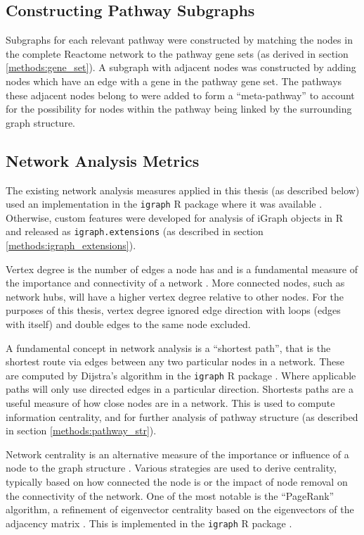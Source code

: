 \subsection{Constructing Pathway Subgraphs} \label{methods:subgraphs}
Subgraphs for each relevant pathway were constructed by matching the nodes in the complete Reactome network to the pathway gene sets (as derived in section \ref{methods:gene_set}). A subgraph with adjacent nodes was constructed by adding nodes which have an edge with a gene in the pathway gene set. The pathways these adjacent nodes belong to were added to form a ``meta-pathway'' to account for the possibility for nodes within the pathway being linked by the surrounding graph structure.

\subsection{Network Analysis Metrics} \label{methods:network_metrics}
The existing network analysis measures applied in this thesis (as described below) used an implementation in the \texttt{igraph} R package where it was available \citep{igraph}. Otherwise, custom features were developed for analysis of iGraph objects in R and released as \texttt{igraph.extensions} (as described in section \ref{methods:igraph_extensions}).

Vertex degree is the number of edges a node has and is a fundamental measure of the importance and connectivity of a network \citep{vanSteen2010}. More connected nodes, such as network hubs, will have a higher vertex degree relative to other nodes. For the purposes of this thesis, vertex degree ignored edge direction with loops (edges with itself) and double edges to the same node excluded.

A fundamental concept in network analysis is a ``shortest path'', that is the shortest route via edges between any two particular nodes in a network. These are computed by Dijstra's algorithm \citep{Dijkstra1959} in the \texttt{igraph} R package \citep{igraph}. Where applicable paths will only use directed edges in a particular direction. Shortests paths are a useful measure of how close nodes are in a network. This is used to compute information centrality, and for further analysis of pathway structure (as described in section \ref{methods:pathway_str}).

Network centrality is an alternative measure of the importance or influence of a node to the graph structure \citep{Borgatti2005}. Various strategies are used to derive centrality,  typically based on how connected the node is or the impact of node removal on the connectivity of the network. One of the most notable is the ``PageRank'' algorithm, a refinement of eigenvector centrality based on the eigenvectors of the adjacency matrix \citep{Brin1998}. This is implemented in the \texttt{igraph} R package \citep{igraph}.

